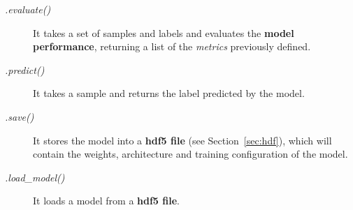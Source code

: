 \begin{description}
	\item[\textit{.evaluate()}] It takes a set of samples and labels and evaluates the \textbf{model performance}, returning a list of the \textit{metrics} previously defined.
\end{description}

\begin{description}
	\item[\textit{.predict()}] It takes a sample and returns the label predicted by the model.
\end{description}

\begin{description}
	\item[\textit{.save()}] It stores the model into a \textbf{\gls{hdf5} file} (see Section~\ref{sec:hdf}), which will contain the weights, architecture and training configuration of the model.
\end{description}

\begin{description}
	\item[\textit{.load\_model()}] It loads a model from a \textbf{\gls{hdf5} file}.
\end{description}


